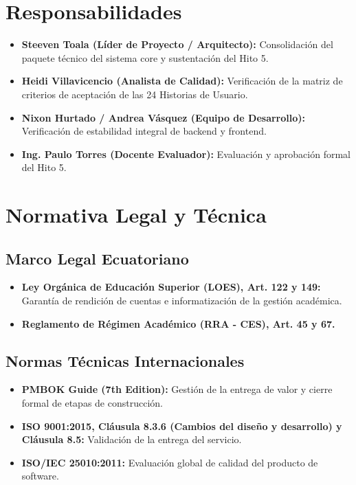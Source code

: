 \documentclass[12pt,a4paper]{article}
\begin{document}
\section{Responsabilidades}
\begin{itemize}[leftmargin=1.5em, itemsep=2pt]
    \item \textbf{Steeven Toala (Líder de Proyecto / Arquitecto):} Consolidación del paquete técnico del sistema core y sustentación del Hito 5.
    \item \textbf{Heidi Villavicencio (Analista de Calidad):} Verificación de la matriz de criterios de aceptación de las 24 Historias de Usuario.
    \item \textbf{Nixon Hurtado / Andrea Vásquez (Equipo de Desarrollo):} Verificación de estabilidad integral de backend y frontend.
    \item \textbf{Ing. Paulo Torres (Docente Evaluador):} Evaluación y aprobación formal del Hito 5.
\end{itemize}

\section{Normativa Legal y Técnica}
\subsection{Marco Legal Ecuatoriano}
\begin{itemize}[leftmargin=1.5em, itemsep=2pt]
    \item \textbf{Ley Orgánica de Educación Superior (LOES), Art. 122 y 149:} Garantía de rendición de cuentas e informatización de la gestión académica.
    \item \textbf{Reglamento de Régimen Académico (RRA - CES), Art. 45 y 67.}
\end{itemize}
\subsection{Normas Técnicas Internacionales}
\begin{itemize}[leftmargin=1.5em, itemsep=2pt]
    \item \textbf{PMBOK Guide (7th Edition):} Gestión de la entrega de valor y cierre formal de etapas de construcción.
    \item \textbf{ISO 9001:2015, Cláusula 8.3.6 (Cambios del diseño y desarrollo) y Cláusula 8.5:} Validación de la entrega del servicio.
    \item \textbf{ISO/IEC 25010:2011:} Evaluación global de calidad del producto de software.
\end{itemize}
\end{document}
